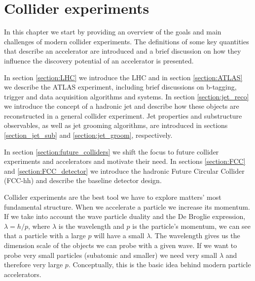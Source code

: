 
\chapter{Collider experiments}
\label{chapter:exp}

In this chapter we start by providing an overview of the goals and main challenges of modern collider experiments. The definitions of some key quantities that describe an accelerator are introduced and a brief discussion on how they influence the discovery potential of an accelerator is presented. 

In section \ref{section:LHC} we introduce the LHC and in section \ref{section:ATLAS} we describe the ATLAS experiment, including brief discussions on b-tagging, trigger and data acquisition algorithms and systems. In section \ref{section:jet_reco} we introduce the concept of a hadronic jet and describe how these objects are reconstructed in a general collider experiment. Jet properties and substructure observables, as well as jet grooming algorithms, are introduced in sections \ref{section_jet_sub} and \ref{section:jet_groom}, respectively. 

In section \ref{section:future_colliders} we shift the focus to future collider experiments and accelerators and motivate their need. In sections \ref{section:FCC} and \ref{section:FCC_detector} we introduce the hadronic Future Circular Collider (FCC-hh) and describe the baseline detector design.

Collider experiments are the best tool we have to explore matters' most fundamental structure. 
When we accelerate a particle we increase its momentum. If we take into account the wave particle duality and the De Broglie expression, $\lambda=h/p$, where $\lambda$ is the wavelength and $p$ is the particle's momentum, we can see that a particle with a large $p$ will have a small $\lambda$. The wavelength gives us the dimension scale of the objects we can probe with a given wave. If we want to probe very small particles (subatomic and smaller) we need very small $\lambda$ and therefore very large $p$. Conceptually, this is the basic idea behind modern particle accelerators. 

